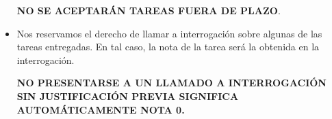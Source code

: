 \begin{itemize}
    \begin{center}
        \Large{
          \textbf{NO SE ACEPTARÁN TAREAS FUERA DE PLAZO}.
        }
        \normalsize
    \end{center}
     
    
  \item
    Nos reservamos el derecho de llamar a interrogación
    sobre algunas de las tareas entregadas.
    En tal caso,
    la nota de la tarea será la obtenida en la interrogación.
    \begin{center}
      \Large{
        \textbf{NO PRESENTARSE A UN LLAMADO A INTERROGACIÓN SIN JUSTIFICACIÓN PREVIA SIGNIFICA AUTOMÁTICAMENTE NOTA 0.}
      }
    \end{center}
    
  \end{itemize}


  
